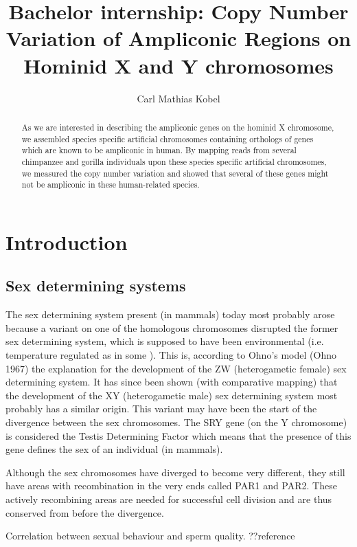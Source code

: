 \documentclass[
journal=jacsat, %
manuscript=article]{achemso}
\author{Carl Mathias Kobel}
\affiliation{BiRC, AU}
\title[\texttt{achemso} demonstration]
{Bachelor internship: Copy Number Variation of Ampliconic Regions on Hominid X and Y chromosomes}
\begin{document}
\begin{abstract}
As we are interested in describing the ampliconic genes on the hominid X chromosome, we assembled species specific artificial chromosomes containing orthologs of genes which are known to be ampliconic in human. By mapping reads from several chimpanzee and gorilla individuals upon these species specific artificial chromosomes, we measured the copy number variation and showed that several of these genes might not be ampliconic in these human-related species.
\end{abstract}

\section{Introduction}


\subsection{Sex determining systems} %
The sex determining system present (in mammals) today most probably arose because a variant on one of the homologous chromosomes disrupted the former sex determining system, which is supposed to have been environmental (i.e. temperature regulated as in some ). This is, according to Ohno's model (Ohno 1967) the explanation for the development of the ZW (heterogametic female) sex determining system. It has since been shown (with comparative mapping) that the development of the XY (heterogametic male) sex determining system most probably has a similar origin.
This variant may have been the start of the divergence between the sex chromosomes. The SRY gene (on the Y chromosome) is considered the Testis Determining Factor which means that the presence of this gene defines the sex of an individual (in mammals).

Although the sex chromosomes have diverged to become very different, they still have areas with recombination in the very ends called PAR1 and PAR2. These actively recombining areas are needed for successful cell division and are thus conserved from before the divergence.

%
Correlation between sexual behaviour and sperm quality. ??reference
\end{document}
